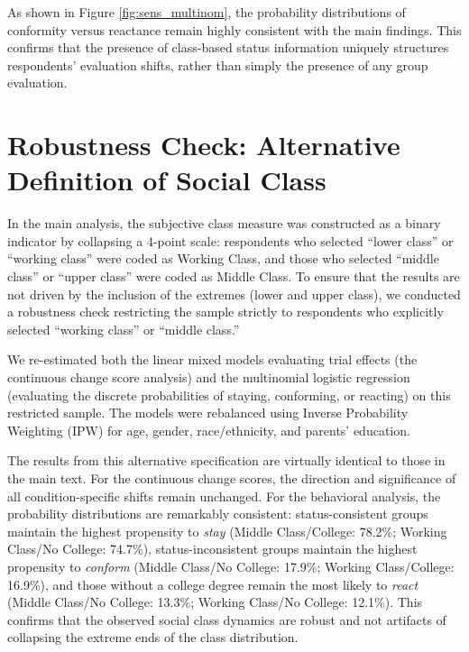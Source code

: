 \documentclass[12pt, letterpaper]{article}
\begin{document}
As shown in Figure \ref{fig:sens_multinom}, the probability distributions of conformity versus reactance remain highly consistent with the main findings. This confirms that the presence of class-based status information uniquely structures respondents' evaluation shifts, rather than simply the presence of any group evaluation.

\newpage
\section{Robustness Check: Alternative Definition of Social Class}
In the main analysis, the subjective class measure was constructed as a binary indicator by collapsing a 4-point scale: respondents who selected ``lower class'' or ``working class'' were coded as Working Class, and those who selected ``middle class'' or ``upper class'' were coded as Middle Class. To ensure that the results are not driven by the inclusion of the extremes (lower and upper class), we conducted a robustness check restricting the sample strictly to respondents who explicitly selected ``working class'' or ``middle class.''

We re-estimated both the linear mixed models evaluating trial effects (the continuous change score analysis) and the multinomial logistic regression (evaluating the discrete probabilities of staying, conforming, or reacting) on this restricted sample. The models were rebalanced using Inverse Probability Weighting (IPW) for age, gender, race/ethnicity, and parents' education.

The results from this alternative specification are virtually identical to those in the main text. For the continuous change scores, the direction and significance of all condition-specific shifts remain unchanged. For the behavioral analysis, the probability distributions are remarkably consistent: status-consistent groups maintain the highest propensity to \textit{stay} (Middle Class/College: 78.2\%; Working Class/No College: 74.7\%), status-inconsistent groups maintain the highest propensity to \textit{conform} (Middle Class/No College: 17.9\%; Working Class/College: 16.9\%), and those without a college degree remain the most likely to \textit{react} (Middle Class/No College: 13.3\%; Working Class/No College: 12.1\%). This confirms that the observed social class dynamics are robust and not artifacts of collapsing the extreme ends of the class distribution.
\end{document}
